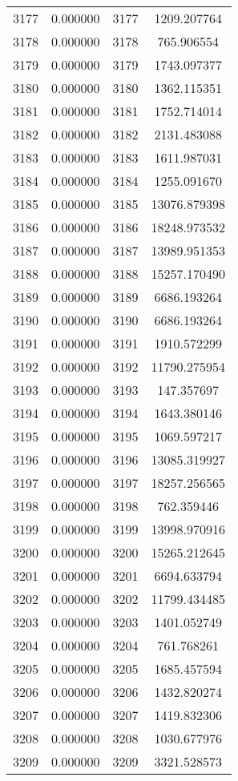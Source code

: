 \documentclass[12pt]{article}
\begin{document}
\begin{longtable}{@{}cccc@{}}
3177 & 0.000000 & 3177 & 1209.207764 \\
3178 & 0.000000 & 3178 & 765.906554 \\
3179 & 0.000000 & 3179 & 1743.097377 \\
3180 & 0.000000 & 3180 & 1362.115351 \\
3181 & 0.000000 & 3181 & 1752.714014 \\
3182 & 0.000000 & 3182 & 2131.483088 \\
3183 & 0.000000 & 3183 & 1611.987031 \\
3184 & 0.000000 & 3184 & 1255.091670 \\
3185 & 0.000000 & 3185 & 13076.879398 \\
3186 & 0.000000 & 3186 & 18248.973532 \\
3187 & 0.000000 & 3187 & 13989.951353 \\
3188 & 0.000000 & 3188 & 15257.170490 \\
3189 & 0.000000 & 3189 & 6686.193264 \\
3190 & 0.000000 & 3190 & 6686.193264 \\
3191 & 0.000000 & 3191 & 1910.572299 \\
3192 & 0.000000 & 3192 & 11790.275954 \\
3193 & 0.000000 & 3193 & 147.357697 \\
3194 & 0.000000 & 3194 & 1643.380146 \\
3195 & 0.000000 & 3195 & 1069.597217 \\
3196 & 0.000000 & 3196 & 13085.319927 \\
3197 & 0.000000 & 3197 & 18257.256565 \\
3198 & 0.000000 & 3198 & 762.359446 \\
3199 & 0.000000 & 3199 & 13998.970916 \\
3200 & 0.000000 & 3200 & 15265.212645 \\
3201 & 0.000000 & 3201 & 6694.633794 \\
3202 & 0.000000 & 3202 & 11799.434485 \\
3203 & 0.000000 & 3203 & 1401.052749 \\
3204 & 0.000000 & 3204 & 761.768261 \\
3205 & 0.000000 & 3205 & 1685.457594 \\
3206 & 0.000000 & 3206 & 1432.820274 \\
3207 & 0.000000 & 3207 & 1419.832306 \\
3208 & 0.000000 & 3208 & 1030.677976 \\
3209 & 0.000000 & 3209 & 3321.528573 \\

\end{longtable}
\end{document}
